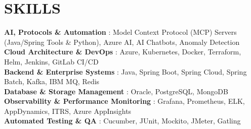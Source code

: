 \section{SKILLS}
 \begin{itemize}[leftmargin=0in, label={}]
    \small{\item{
     \textbf{AI, Protocols \& Automation} {: Model Context Protocol (MCP) Servers (Java/Spring Tools \& Python), Azure AI, AI Chatbots, Anomaly Detection}\vspace{2pt} \\
    \textbf{Cloud Architecture \& DevOps} {: Azure, Kubernetes, Docker, Terraform, Helm, Jenkins, GitLab CI/CD}\vspace{2pt} \\
    \textbf{Backend \& Enterprise Systems} {: Java, Spring Boot, Spring Cloud, Spring Batch, Kafka, IBM MQ, Redis}\vspace{2pt} \\
    \textbf{Database \& Storage Management} {: Oracle, PostgreSQL, MongoDB}\vspace{2pt} \\
    \textbf{Observability \& Performance Monitoring} {: Grafana, Prometheus, ELK, AppDynamics, ITRS, Azure AppInsights}\vspace{2pt} \\
    \textbf{Automated Testing \& QA} {: Cucumber, JUnit, Mockito, JMeter, Gatling}
    }}
 \end{itemize}